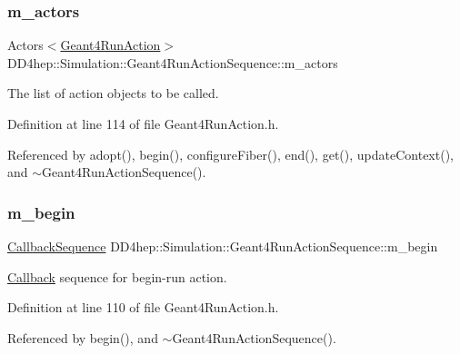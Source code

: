 \subsubsection{\texorpdfstring{m\+\_\+actors}{m\_actors}}
{\footnotesize\ttfamily Actors$<$\hyperlink{class_d_d4hep_1_1_simulation_1_1_geant4_run_action}{Geant4\+Run\+Action}$>$ D\+D4hep\+::\+Simulation\+::\+Geant4\+Run\+Action\+Sequence\+::m\+\_\+actors\hspace{0.3cm}{\ttfamily [protected]}}



The list of action objects to be called. 



Definition at line 114 of file Geant4\+Run\+Action.\+h.



Referenced by adopt(), begin(), configure\+Fiber(), end(), get(), update\+Context(), and $\sim$\+Geant4\+Run\+Action\+Sequence().

\hypertarget{class_d_d4hep_1_1_simulation_1_1_geant4_run_action_sequence_a833ebd7f7da62ebeeb561815387b0bbe}{}\label{class_d_d4hep_1_1_simulation_1_1_geant4_run_action_sequence_a833ebd7f7da62ebeeb561815387b0bbe} 
\subsubsection{\texorpdfstring{m\+\_\+begin}{m\_begin}}
{\footnotesize\ttfamily \hyperlink{struct_d_d4hep_1_1_callback_sequence}{Callback\+Sequence} D\+D4hep\+::\+Simulation\+::\+Geant4\+Run\+Action\+Sequence\+::m\+\_\+begin\hspace{0.3cm}{\ttfamily [protected]}}



\hyperlink{class_d_d4hep_1_1_callback}{Callback} sequence for begin-\/run action. 



Definition at line 110 of file Geant4\+Run\+Action.\+h.



Referenced by begin(), and $\sim$\+Geant4\+Run\+Action\+Sequence().

\hypertarget{class_d_d4hep_1_1_simulation_1_1_geant4_run_action_sequence_a94c03005b1c789e05144558c840737f6}{}\label{class_d_d4hep_1_1_simulation_1_1_geant4_run_action_sequence_a94c03005b1c789e05144558c840737f6} 
